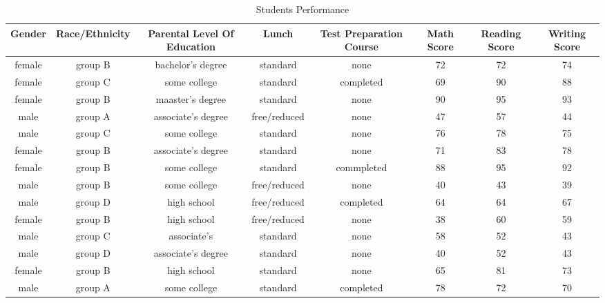 \documentclass{article}
\begin{document}
	\begin{sidewaystable}
		\begin{center}		
			\label{tab:Table}
			\caption{Students Performance}
			\begin{tabular}{|c|c|c|c|c|c|c|c|}
			\hline		
			\textbf{Gender}&\textbf{Race/Ethnicity}&\textbf{Parental Level Of Education}&\textbf{Lunch}&\textbf{Test Preparation Course}&\textbf{Math Score}&\textbf{Reading Score}&\textbf{Writing Score}\\	
			\hline
			 female&group B&bachelor's degree& standard&none&72&72&74\\
			 female&group C&some college&standard&completed&69&90&88\\
			 female& group B&maaster's degree&standard&none&90&95&93\\
			 male&group A&associate's degree&free/reduced&none&47&57&44\\
			 male&group C&some college&standard&none&76&78&75\\
			 female& group B&associate's degree&standard&none&71&83&78\\
			 female&group B&some college&standard&commpleted&88&95&92\\
			 male& group B&some college&free/reduced&none&40&43&39\\
			 male& group D&high school&free/reduced&completed&64&64&67\\
			 female&group B&high school&free/reduced&none&38&60&59\\
			 male&group C&associate's&standard&none&58&52&43\\
		 	male& group D&associate's degree&standard&none &40&52&43\\
			 female&group B&high school &standard& none &65 & 81 & 73\\
			 male& group A&some college&standard&completed&78&72&70\\
			 \hline
		\end{tabular}
	\end{center}
	\end{sidewaystable}
\end{document}

